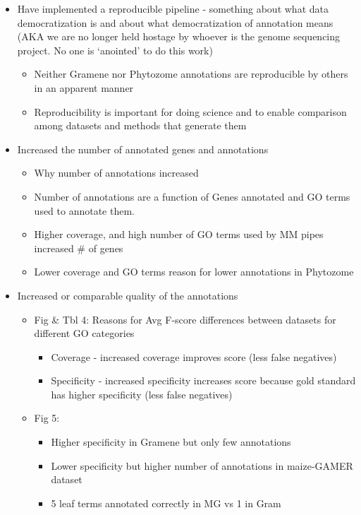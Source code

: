 \begin{itemize}
  \item Have implemented a reproducible pipeline - something about what data democratization is and about what democratization of annotation means (AKA we are no longer held hostage by whoever is the genome sequencing project.  No one is ‘anointed’ to do this work)
  \begin{itemize}
    \item Neither Gramene nor Phytozome annotations are reproducible by others in an apparent manner
    \item Reproducibility is important for doing science and to enable comparison among datasets and methods that generate them
  \end{itemize}
  \item Increased the number of annotated genes and annotations
  \begin{itemize}
    \item Why number of annotations increased
    \item Number of annotations are a function of Genes annotated and GO terms used to annotate them.
    \item Higher coverage, and high number of GO terms used by MM pipes increased \# of genes
    \item Lower coverage and GO terms reason for lower annotations in Phytozome
  \end{itemize}
  \item Increased or comparable quality of the annotations
  \begin{itemize}
    \item Fig \& Tbl 4: Reasons for Avg F-score differences between datasets for different GO categories
    \begin{itemize}
      \item Coverage - increased coverage improves score (less false negatives)
      \item Specificity - increased specificity increases score because gold standard has higher specificity (less false negatives)
    \end{itemize}
    \item Fig 5:
    \begin{itemize}
      \item Higher specificity in Gramene but only few annotations
      \item Lower specificity but higher number of annotations in maize-GAMER dataset
      \item 5 leaf terms annotated correctly in MG vs 1 in Gram

\end{itemize}
\end{itemize}
\end{itemize}
